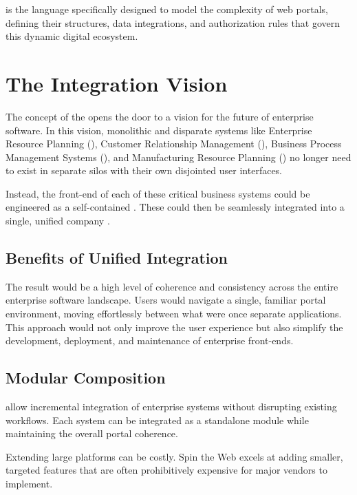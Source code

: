 \wbdl{} is the language specifically designed to model the complexity of web portals, defining their structures, data integrations, and authorization rules that govern this dynamic digital ecosystem.

\section{The Integration Vision}
\label{sec:integration-vision}

The concept of the \textbf{\webbaselet{}} opens the door to a vision for the future of enterprise software. In this vision, monolithic and disparate systems like Enterprise Resource Planning (\erp{}), Customer Relationship Management (\crm{}), Business Process Management Systems (\bpms{}), and Manufacturing Resource Planning (\mrp{}) no longer need to exist in separate silos with their own disjointed user interfaces.

Instead, the front-end of each of these critical business systems could be engineered as a self-contained \textbf{\webbaselet{}}. These  could then be seamlessly integrated into a single, unified company \textbf{\webbase{}}.

\subsection{Benefits of Unified Integration}

The result would be a high level of coherence and consistency across the entire enterprise software landscape. Users would navigate a single, familiar portal environment, moving effortlessly between what were once separate applications. This approach would not only improve the user experience but also simplify the development, deployment, and maintenance of enterprise front-ends.

\subsection{Modular Composition}

 allow incremental integration of enterprise systems without disrupting existing workflows. Each system can be integrated as a standalone module while maintaining the overall portal coherence.

Extending large platforms can be costly. Spin the Web excels at adding smaller, targeted features that are often prohibitively expensive for major vendors to implement.

